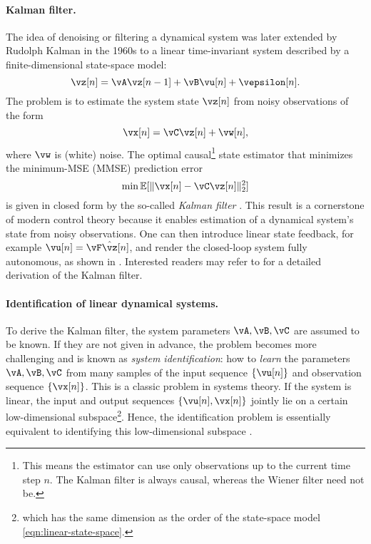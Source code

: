 \documentclass[../../book-main.tex]{subfiles}
\begin{document}
\paragraph{Kalman filter.} 
The idea of denoising or filtering a dynamical system was later extended by Rudolph Kalman in the 1960s to a linear time-invariant system described by a finite-dimensional state-space model:
\begin{equation}
    \vz[n] = \vA \vz[n-1] + \vB\vu[n] + \vepsilon[n]. 
    \label{eqn:linear-state-space}
\end{equation}
The problem is to estimate the system state \(\vz[n]\) from noisy observations of the form
\begin{equation}
    \vx[n] = \vC \vz[n] + \vw[n],
    \label{eqn:Kalman-model}
\end{equation}
where \(\vw\) is (white) noise. The optimal causal\footnote{This means the estimator can use only observations up to the current time step \(n\). The Kalman filter is always causal, whereas the Wiener filter need not be.} state estimator that minimizes the minimum-MSE (MMSE) prediction error
\begin{equation}
    \min \Ex[ \|\vx[n] - \vC\vz[n]\|_{2}^{2}]
    \label{eqn:kalman-mse}
\end{equation}
is given in closed form by the so-called \textit{Kalman filter} \cite{kalman1960new}. This result is a cornerstone of modern control theory because it enables estimation of a dynamical system's state from noisy observations. One can then introduce linear state feedback, for example \(\vu[n] = \vF \hat{\vz}[n]\), and render the closed-loop system fully autonomous, as shown in .  Interested readers may refer to \cite[Appendix B]{MaY2003} for a detailed derivation of the Kalman filter.

\paragraph{Identification of linear dynamical systems.}
To derive the Kalman filter, the system parameters \(\vA, \vB, \vC\) are assumed to be known. If they are not given in advance, the problem becomes more challenging and is known as \textit{system identification}: how to \textit{learn} the parameters \(\vA, \vB, \vC\) from many samples of the input sequence \(\{\vu[n]\}\) and observation sequence \(\{\vx[n]\}\). This is a classic problem in systems theory. If the system is linear, the input and output sequences \(\{\vu[n], \vx[n]\}\) jointly lie on a certain low-dimensional subspace\footnote{which has the same dimension as the order of the state-space model \eqref{eqn:linear-state-space}.}. Hence, the identification problem is essentially equivalent to identifying this low-dimensional subspace \cite{OverscheeP1996,Liu-2009-CDC,Liu-2010-SIAM}.
\end{document}
